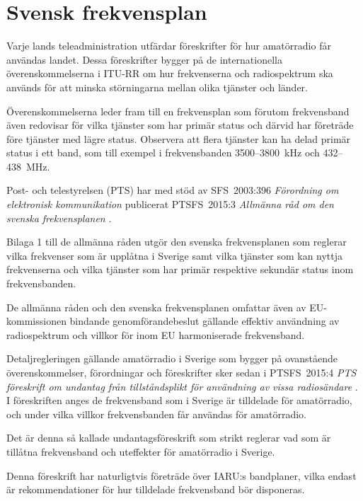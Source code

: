 \chapter{Svensk frekvensplan} 
\label{svensk frekvensplan} 

Varje lands teleadministration utfärdar föreskrifter för hur amatörradio får
användas landet.
Dessa föreskrifter bygger på de internationella överenskommelserna i ITU-RR
\cite[ARTICLE 5]{ITU-RR} om hur frekvenserna och radiospektrum ska används för att minska
störningarna mellan olika tjänster och länder.

Överenskommelserna leder fram till en frekvensplan som förutom frekvensband även
redovisar för vilka tjänster som har primär status och därvid har företräde före
tjänster med lägre status.
Observera att flera tjänster kan ha delad primär status i ett band, som till 
exempel i frekvensbanden 3500--3800~kHz och 432--438~MHz. 

Post- och telestyrelsen (PTS) har med stöd av SFS~2003:396
\emph{Förordning om elektronisk kommunikation} \cite{SFS2003:396}
publicerat PTSFS~2015:3 \emph{Allmänna råd om den svenska frekvensplanen}
\cite{PTSFS2015:3}.

Bilaga 1 till de allmänna råden utgör den svenska frekvensplanen som reglerar
vilka frekvenser som är upplåtna i Sverige samt vilka tjänster som kan nyttja
frekvenserna och vilka tjänster som har primär respektive sekundär status inom
frekvensbanden.

De allmänna råden och den svenska frekvensplanen omfattar även av 
EU-kommissionen bindande genomförandebeslut gällande effektiv användning av
radiospektrum och villkor för inom EU harmoniserade frekvensband.

Detaljregleringen gällande amatörradio i Sverige som bygger på ovanstående
överenskommelser, förordningar och föreskrifter sker sedan i PTSFS~2015:4
\emph{PTS föreskrift om undantag från tillståndsplikt för användning av vissa
  radiosändare} \cite{PTSFS2015:4}.
I föreskriften anges de frekvensband som i Sverige är tilldelade för
amatörradio, och under vilka villkor frekvensbanden får användas för
amatörradio.
 
Det är denna så kallade undantagsföreskrift som strikt reglerar vad som är 
tillåtna frekvensband och uteffekter för amatörradio i Sverige.
 
Denna föreskrift har naturligtvis företräde över IARU:s bandplaner, vilka
endast  är rekommendationer för hur tilldelade frekvensband bör disponeras.  

